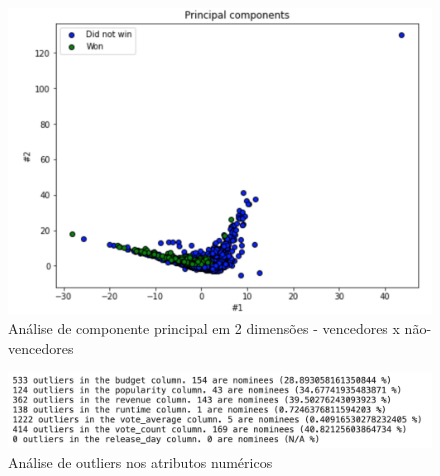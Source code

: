             
            \begin{figure}[htb]
            	\caption{\label{pca_2}Análise de componente principal em 2 dimensões - vencedores x não-vencedores}
            	\begin{center}
            		\includegraphics[scale=0.7]{pca_2.png}
            	\end{center}
            \end{figure}
            
            
            \begin{figure}[htb]
            	\caption{\label{outliers}Análise de outliers nos atributos numéricos}
            	\begin{center}
            		\includegraphics[scale=0.7]{outliers.png}
            	\end{center}
            \end{figure}
            
